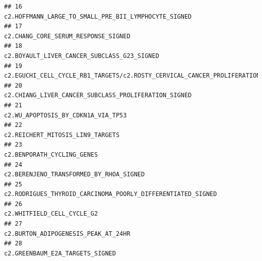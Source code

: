 \documentclass{article}\usepackage[]{graphicx}\usepackage[]{color}
\makeatletter
\newenvironment{kframe}{%
 \def\at@end@of@kframe{}%
 \ifinner\ifhmode%
  \def\at@end@of@kframe{\end{minipage}}%
  \begin{minipage}{\columnwidth}%
 \fi\fi%
 \def\FrameCommand##1{\hskip\@totalleftmargin \hskip-\fboxsep
 \colorbox{shadecolor}{##1}\hskip-\fboxsep
     \hskip-\linewidth \hskip-\@totalleftmargin \hskip\columnwidth}%
 \MakeFramed {\advance\hsize-\width
   \@totalleftmargin\z@ \linewidth\hsize
   \@setminipage}}%
 {\par\unskip\endMakeFramed%
 \at@end@of@kframe}
\newenvironment{knitrout}{}{} %
\makeatother
\begin{document}
\begin{knitrout}
\begin{kframe}
\begin{verbatim}
## 16                                                                                                                                                              c2.HOFFMANN_LARGE_TO_SMALL_PRE_BII_LYMPHOCYTE_SIGNED
## 17                                                                                                                                                                               c2.CHANG_CORE_SERUM_RESPONSE_SIGNED
## 18                                                                                                                                                                       c2.BOYAULT_LIVER_CANCER_SUBCLASS_G23_SIGNED
## 19                                                   c2.EGUCHI_CELL_CYCLE_RB1_TARGETS/c2.ROSTY_CERVICAL_CANCER_PROLIFERATION_CLUSTER/c4.GNF2_BUB1/c4.GNF2_ESPL1/c4.GNF2_PCNA/c4.GNF2_RRM2/c4.GNF2_BUB1B/c4.GNF2_MCM4
## 20                                                                                                                                                              c2.CHIANG_LIVER_CANCER_SUBCLASS_PROLIFERATION_SIGNED
## 21                                                                                                                                                                                c2.WU_APOPTOSIS_BY_CDKN1A_VIA_TP53
## 22                                                                                                                                                                                  c2.REICHERT_MITOSIS_LIN9_TARGETS
## 23                                                                                                                                                                                        c2.BENPORATH_CYCLING_GENES
## 24                                                                                                                                                                           c2.BERENJENO_TRANSFORMED_BY_RHOA_SIGNED
## 25                                                                                                                                                       c2.RODRIGUES_THYROID_CARCINOMA_POORLY_DIFFERENTIATED_SIGNED
## 26                                                                                                                                                                                        c2.WHITFIELD_CELL_CYCLE_G2
## 27                                                                                                                                                                               c2.BURTON_ADIPOGENESIS_PEAK_AT_24HR
## 28                                                                                                                                                                                   c2.GREENBAUM_E2A_TARGETS_SIGNED

\end{verbatim}
\end{kframe}
\end{knitrout}
\end{document}
